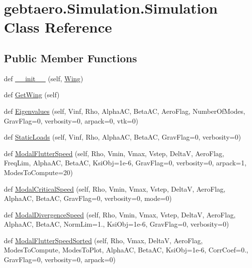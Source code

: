 \hypertarget{classgebtaero_1_1_simulation_1_1_simulation}{}\section{gebtaero.\+Simulation.\+Simulation Class Reference}
\label{classgebtaero_1_1_simulation_1_1_simulation}
\subsection*{Public Member Functions}
\begin{DoxyCompactItemize}
\item 
def \hyperlink{classgebtaero_1_1_simulation_1_1_simulation_a865b25fd48ff7aded232e634e28679c3}{\+\_\+\+\_\+init\+\_\+\+\_\+} (self, \hyperlink{classgebtaero_1_1_wing_1_1_wing}{Wing})
\item 
def \hyperlink{classgebtaero_1_1_simulation_1_1_simulation_a2d7432b48522221861693e98b03568c4}{Get\+Wing} (self)
\item 
def \hyperlink{classgebtaero_1_1_simulation_1_1_simulation_a03a37673e2e1c67de5eaeb261512d122}{Eigenvalues} (self, Vinf, Rho, Alpha\+AC, Beta\+AC, Aero\+Flag, Number\+Of\+Modes, Grav\+Flag=0, verbosity=0, arpack=0, vtk=0)
\item 
def \hyperlink{classgebtaero_1_1_simulation_1_1_simulation_a36da2334a6e743a9ab29bdfe1334ed04}{Static\+Loads} (self, Vinf, Rho, Alpha\+AC, Beta\+AC, Grav\+Flag=0, verbosity=0)
\item 
def \hyperlink{classgebtaero_1_1_simulation_1_1_simulation_ab62864a7bf462387f4cbe24b061b803a}{Modal\+Flutter\+Speed} (self, Rho, Vmin, Vmax, Vstep, DeltaV, Aero\+Flag, Freq\+Lim, Alpha\+AC, Beta\+AC, Ksi\+Obj=1e-\/6, Grav\+Flag=0, verbosity=0, arpack=1, Modes\+To\+Compute=20)
\item 
def \hyperlink{classgebtaero_1_1_simulation_1_1_simulation_a62d8fc83c485da26015167268f4b8bb4}{Modal\+Critical\+Speed} (self, Rho, Vmin, Vmax, Vstep, DeltaV, Aero\+Flag, Alpha\+AC, Beta\+AC, Grav\+Flag=0, verbosity=0, mode=0)
\item 
def \hyperlink{classgebtaero_1_1_simulation_1_1_simulation_ac3bea60a9f9d2c552125644a3256df88}{Modal\+Divergence\+Speed} (self, Rho, Vmin, Vmax, Vstep, DeltaV, Aero\+Flag, Alpha\+AC, Beta\+AC, Norm\+Lim=1., Ksi\+Obj=1e-\/6, Grav\+Flag=0, verbosity=0)
\item 
def \hyperlink{classgebtaero_1_1_simulation_1_1_simulation_ae06bc82e983fb16d7f3e303046a39a2e}{Modal\+Flutter\+Speed\+Sorted} (self, Rho, Vmax, DeltaV, Aero\+Flag, Modes\+To\+Compute, Modes\+To\+Plot, Alpha\+AC, Beta\+AC, Ksi\+Obj=1e-\/6, Corr\+Coef=0., Grav\+Flag=0, verbosity=0, arpack=0)

\end{DoxyCompactItemize}
